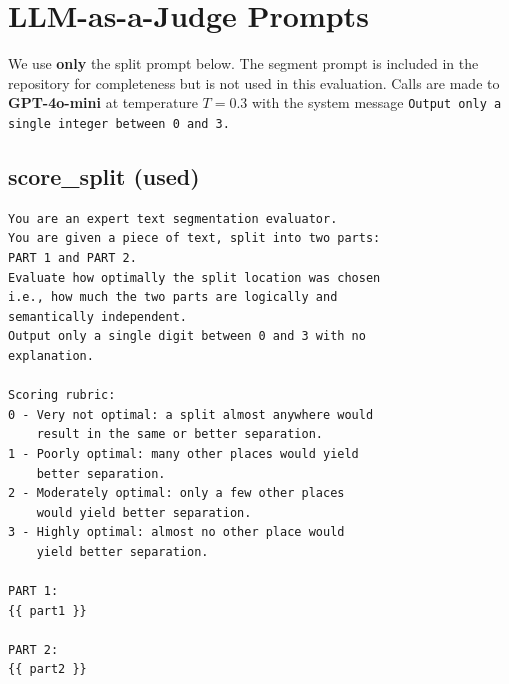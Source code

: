 \documentclass[conference]{IEEEtran}
\begin{document}
\appendix

\section*{LLM-as-a-Judge Prompts}

We use \textbf{only} the split prompt below. The segment prompt is included
in the repository for completeness but is not used in this evaluation.
Calls are made to \textbf{GPT-4o-mini} at temperature $T = 0.3$ with the
system message \texttt{Output only a single integer between 0 and 3.}

\subsection*{score\_split (used)}

\begin{verbatim}
You are an expert text segmentation evaluator.
You are given a piece of text, split into two parts:
PART 1 and PART 2.
Evaluate how optimally the split location was chosen
i.e., how much the two parts are logically and
semantically independent.
Output only a single digit between 0 and 3 with no
explanation.

Scoring rubric:
0 - Very not optimal: a split almost anywhere would
    result in the same or better separation.
1 - Poorly optimal: many other places would yield
    better separation.
2 - Moderately optimal: only a few other places
    would yield better separation.
3 - Highly optimal: almost no other place would
    yield better separation.

PART 1:
{{ part1 }}

PART 2:
{{ part2 }}
\end{verbatim}
\end{document}
